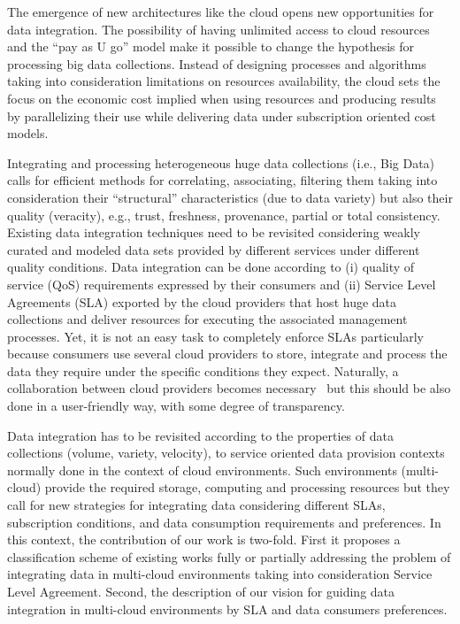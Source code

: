 The emergence of new architectures like the cloud opens new opportunities for data integration. 
The possibility of having unlimited access to cloud resources and the ``pay as U go'' model make it possible to change the hypothesis for processing big  data collections.  Instead of designing processes and algorithms taking into consideration  limitations on resources availability, the cloud sets the focus on the economic cost implied when using resources and producing results by parallelizing their use while delivering data under subscription oriented cost models.
 
Integrating and processing heterogeneous huge data collections (i.e., Big Data) calls for efficient methods for correlating, associating, filtering them taking into consideration their ``structural'' characteristics (due to data variety) but also their quality (veracity), e.g., trust, freshness, provenance, partial or total consistency. 
Existing data integration techniques need to be revisited considering weakly curated and modeled data sets provided by different services under different quality conditions. Data integration can be done according to  (i) quality of service (QoS) requirements expressed by their consumers and (ii) Service Level Agreements (SLA)  exported by the cloud providers that host  huge data collections and deliver resources for executing the associated management processes. Yet, it is not an easy task to completely enforce SLAs particularly because consumers use several cloud providers to store, integrate and process the data they require under the specific conditions they expect.
Naturally, a collaboration between cloud providers becomes necessary~\cite{036} but this should be also done in a user-friendly way, with some degree of transparency. 


Data integration has to be revisited according to  the properties of data collections (volume, variety, velocity), to service oriented data provision contexts normally done in the context of cloud environments. Such environments (multi-cloud)  provide the required storage, computing and processing resources but they call for new strategies for integrating data considering different SLAs, subscription conditions, and data consumption requirements and preferences. In this context, the contribution of our work is two-fold. First it proposes a classification scheme of existing works fully or partially addressing the problem of integrating data in multi-cloud environments  taking into consideration Service Level Agreement. Second, the description of our vision  for guiding data integration in multi-cloud environments  by SLA and data consumers preferences. 

